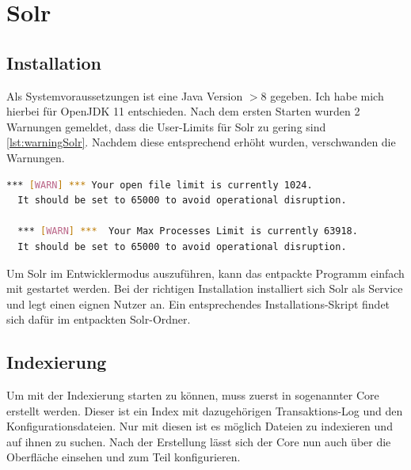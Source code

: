 
\section{Solr}

\subsection{Installation}

Als Systemvoraussetzungen ist eine Java Version $> 8$ gegeben. Ich habe mich hierbei für OpenJDK 11 entschieden. 
Nach dem ersten Starten wurden 2 Warnungen gemeldet, dass die User-Limits für Solr zu gering sind \ref{lst:warningSolr}. Nachdem diese entsprechend erhöht wurden, verschwanden die Warnungen.

\begin{lstlisting}[language=bash, frame=single, label={lst:warningSolr}] 
  *** [WARN] *** Your open file limit is currently 1024.
  It should be set to 65000 to avoid operational disruption.

  *** [WARN] ***  Your Max Processes Limit is currently 63918.
  It should be set to 65000 to avoid operational disruption.
\end{lstlisting}

Um Solr im Entwicklermodus auszuführen, kann das entpackte Programm einfach mit  gestartet werden. 
Bei der richtigen Installation installiert sich Solr als Service und legt einen eignen Nutzer an. Ein entsprechendes Installations-Skript findet sich dafür im entpackten Solr-Ordner.

\subsection{Indexierung}

Um mit der Indexierung starten zu können, muss zuerst in sogenannter Core erstellt werden. Dieser ist ein Index mit dazugehörigen Transaktions-Log und den Konfigurationsdateien. Nur mit diesen ist es möglich Dateien zu indexieren und auf ihnen zu suchen. Nach der Erstellung lässt sich der Core nun auch über die Oberfläche einsehen und zum Teil konfigurieren.

